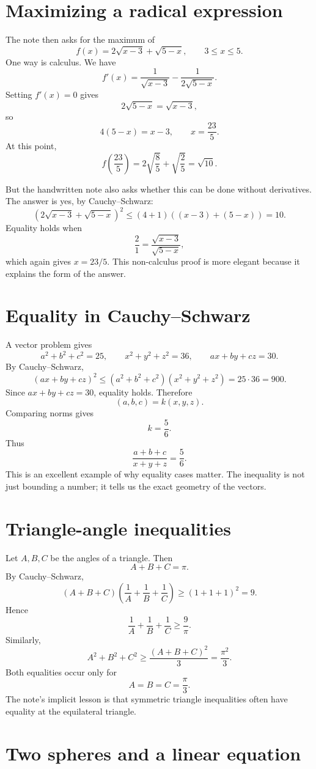 \section{Maximizing a radical expression}

The note then asks for the maximum of
\[
  f(x)=2\sqrt{x-3}+\sqrt{5-x},\qquad 3\le x\le5.
\]
One way is calculus.  We have
\[
  f'(x)=\frac1{\sqrt{x-3}}-\frac1{2\sqrt{5-x}}.
\]
Setting \(f'(x)=0\) gives
\[
  2\sqrt{5-x}=\sqrt{x-3},
\]
so
\[
  4(5-x)=x-3,\qquad x=\frac{23}{5}.
\]
At this point,
\[
  f\left(\frac{23}{5}\right)
  =2\sqrt{\frac85}+\sqrt{\frac25}
  =\sqrt{10}.
\]

But the handwritten note also asks whether this can be done without derivatives.  The answer is yes, by Cauchy--Schwarz:
\[
  \left(2\sqrt{x-3}+\sqrt{5-x}\right)^2
  \le (4+1)((x-3)+(5-x))=10.
\]
Equality holds when
\[
  \frac{2}{1}=\frac{\sqrt{x-3}}{\sqrt{5-x}},
\]
which again gives \(x=23/5\).  This non-calculus proof is more elegant because it explains the form of the answer.

\section{Equality in Cauchy--Schwarz}

A vector problem gives
\[
  a^2+b^2+c^2=25,\qquad x^2+y^2+z^2=36,\qquad ax+by+cz=30.
\]
By Cauchy--Schwarz,
\[
  (ax+by+cz)^2\le(a^2+b^2+c^2)(x^2+y^2+z^2)=25\cdot36=900.
\]
Since \(ax+by+cz=30\), equality holds.  Therefore
\[
  (a,b,c)=k(x,y,z).
\]
Comparing norms gives
\[
  k=\frac56.
\]
Thus
\[
  \frac{a+b+c}{x+y+z}=\frac56.
\]
This is an excellent example of why equality cases matter.  The inequality is not just bounding a number; it tells us the exact geometry of the vectors.

\section{Triangle-angle inequalities}

Let \(A,B,C\) be the angles of a triangle.  Then
\[
  A+B+C=\pi.
\]
By Cauchy--Schwarz,
\[
  (A+B+C)\left(\frac1A+\frac1B+\frac1C\right)\ge(1+1+1)^2=9.
\]
Hence
\[
  \frac1A+\frac1B+\frac1C\ge\frac9\pi.
\]
Similarly,
\[
  A^2+B^2+C^2\ge\frac{(A+B+C)^2}{3}=\frac{\pi^2}{3}.
\]
Both equalities occur only for
\[
  A=B=C=\frac\pi3.
\]
The note's implicit lesson is that symmetric triangle inequalities often have equality at the equilateral triangle.

\section{Two spheres and a linear equation}

